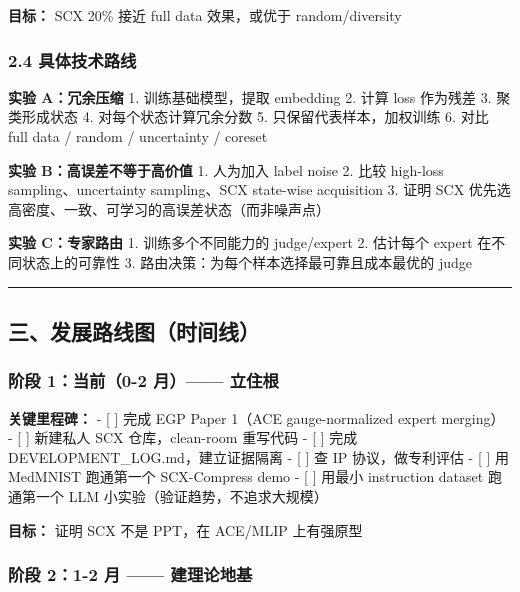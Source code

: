 \documentclass[
  12pt,
]{ctexart}
\begin{document}
\textbf{目标：} SCX 20\% 接近 full data 效果，或优于 random/diversity

\subsubsection{2.4
具体技术路线}\label{ux5177ux4f53ux6280ux672fux8defux7ebf}

\textbf{实验 A：冗余压缩} 1. 训练基础模型，提取 embedding 2. 计算 loss
作为残差 3. 聚类形成状态 4. 对每个状态计算冗余分数 5.
只保留代表样本，加权训练 6. 对比 full data / random / uncertainty /
coreset

\textbf{实验 B：高误差不等于高价值} 1. 人为加入 label noise 2. 比较
high-loss sampling、uncertainty sampling、SCX state-wise acquisition 3.
证明 SCX 优先选高密度、一致、可学习的高误差状态（而非噪声点）

\textbf{实验 C：专家路由} 1. 训练多个不同能力的 judge/expert 2. 估计每个
expert 在不同状态上的可靠性 3.
路由决策：为每个样本选择最可靠且成本最优的 judge

\begin{center}\rule{0.5\linewidth}{0.5pt}\end{center}

\subsection{三、发展路线图（时间线）}\label{ux4e09ux53d1ux5c55ux8defux7ebfux56feux65f6ux95f4ux7ebf}

\subsubsection{阶段 1：当前（0-2 月）------
立住根}\label{ux9636ux6bb5-1ux5f53ux524d0-2-ux6708-ux7acbux4f4fux6839}

\textbf{关键里程碑：} - {[} {]} 完成 EGP Paper 1（ACE gauge-normalized
expert merging） - {[} {]} 新建私人 SCX 仓库，clean-room 重写代码 - {[}
{]} 完成 DEVELOPMENT\_LOG.md，建立证据隔离 - {[} {]} 查 IP
协议，做专利评估 - {[} {]} 用 MedMNIST 跑通第一个 SCX-Compress demo -
{[} {]} 用最小 instruction dataset 跑通第一个 LLM
小实验（验证趋势，不追求大规模）

\textbf{目标：} 证明 SCX 不是 PPT，在 ACE/MLIP 上有强原型

\subsubsection{阶段 2：1-2 月 ------
建理论地基}\label{ux9636ux6bb5-21-2-ux6708-ux5efaux7406ux8bbaux5730ux57fa}
\end{document}
